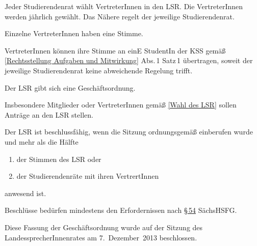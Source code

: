 \documentclass[
	pdftex,
]{scrartcl}
\begin{document}
\begin{contract}
\label{Wahl des LSR}

Jeder Studierendenrat wählt VertreterInnen in den LSR. Die VertreterInnen werden jährlich gewählt. Das Nähere regelt der jeweilige Studierendenrat.

Einzelne VertreterInnen haben eine Stimme.

VertreterInnen können ihre Stimme an einE StudentIn der KSS gemäß \ref{Rechtsstellung Aufgaben und Mitwirkung} Abs.\,1 Satz\,1 übertragen, soweit der jeweilige Studierendenrat keine abweichende Regelung trifft.

\label{Sitzungen des LSR}

Der LSR gibt sich eine Geschäftsordnung.

Insbesondere Mitglieder oder VertreterInnen gemäß \ref{Wahl des LSR} sollen Anträge an den LSR stellen.

Der LSR ist beschlussfähig, wenn die Sitzung ordnungsgemäß einberufen wurde und mehr als die Hälfte
\begin{enumerate}
\item der Stimmen des LSR oder
\item der Studierendenräte mit ihren VertrertInnen
\end{enumerate}
anwesend ist.

Beschlüsse bedürfen mindestens den Erfordernissen nach \href{http://www.revosax.sachsen.de/Details.do?sid=2963315631632&jlink=p54}{§\,54} SächsHSFG.





\end{contract}

\newpage

\parnumberfalse{}\parnumbertrue

Diese Fassung der Geschäftsordnung wurde auf der Sitzung des LandessprecherInnenrates am 7.~Dezember~2013 beschlossen.
\end{document}
